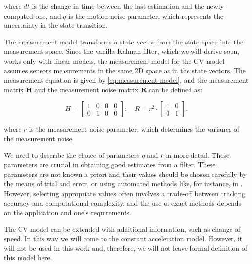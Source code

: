 where $dt$ is the change in time between the last estimation and the newly computed one, and $q$ is the motion noise parameter, which represents the uncertainty in the state transition.

The measurement model transforms a state vector from the state space into the measurement space. Since the vanilla Kalman filter, which we will derive soon, works only with linear models, the measurement model for the CV model assumes sensors measurements in the same 2D space as in the state vectors. The measurement equation is given by \ref{eq:measurement-model}, and the measurement matrix $\mathbf{H}$ and the measurement noise matrix $\mathbf{R}$ can be defined as:

\begin{equation}
    H =
    \begin{bmatrix}
        1 & 0 &0 & 0 \\
        0 & 1 &0 & 0
    \end{bmatrix};
    \quad
    R =
    r^{2}\cdot
    \begin{bmatrix}
        1 & 0 \\
        0 & 1
    \end{bmatrix},
\end{equation}

where $r$ is the measurement noise parameter, which determines the variance of the measurement noise.

We need to describe the choice of parameters $q$ and $r$ in more detail. These parameters are crucial in obtaining good estimates from a filter. These parameters are not known a priori and their values should be chosen carefully by the means of trial and error, or using automated methods like, for instance, in \cite{bulutProcessMeasurementNoise2011}. However, selecting appropriate values often involves a trade-off between tracking accuracy and computational complexity, and the use of exact methods depends on the application and one's requirements.

The CV model can be extended with additional information, such as change of speed. In this way we will come to the constant acceleration model. However, it will not be used in this work and, therefore, we will not leave formal definition of this model here.
